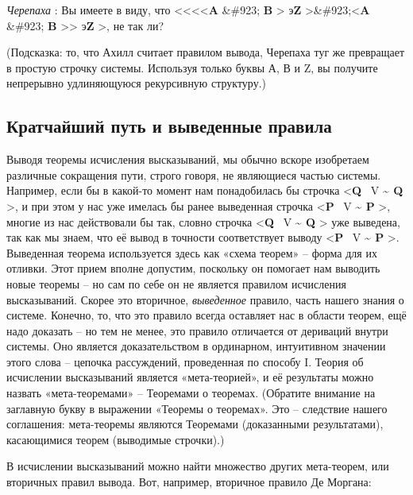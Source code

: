 \documentclass[../main.tex]{subfiles}
\begin{document}
\emph{Черепаха} : Вы имеете в виду, что \textless\textless\textless\textless{}\textbf{A} \&\#923; \textbf{B} \textgreater{} э\textbf{Z} \textgreater\&\#923;\textless{}\textbf{A} \&\#923; \textbf{B} \textgreater\textgreater{} э\textbf{Z} \textgreater, не так ли?

(Подсказка: то, что Ахилл считает правилом вывода, Черепаха туг же превращает в простую строчку системы. Используя только буквы А, В и Z, вы получите непрерывно удлиняющуюся рекурсивную структуру.)


\subsection{Кратчайший путь и выведенные правила}

Выводя теоремы исчисления высказываний, мы обычно вскоре изобретаем различные сокращения пути, строго говоря, не являющиеся частью системы. Например, если бы в какой-то момент нам понадобилась бы строчка \textless{}\textbf{Q} ~V \textbf{\textasciitilde{} Q} \textgreater, и при этом у нас уже имелась бы ранее выведенная строчка \textless{}\textbf{P} ~V \textbf{\textasciitilde{} P} \textgreater, многие из нас действовали бы так, словно строчка \textless{}\textbf{Q} ~V \textbf{\textasciitilde{} Q} \textgreater{} уже выведена, так как мы знаем, что её вывод в точности соответствует выводу \textless{}\textbf{P} ~V \textbf{\textasciitilde{} P} \textgreater. Выведенная теорема используется здесь как «схема теорем» \--- форма для их отливки. Этот прием вполне допустим, поскольку он помогает нам выводить новые теоремы \--- но сам по себе он не является правилом исчисления высказываний. Скорее это вторичное, \emph{выведенное} правило, часть нашего знания о системе. Конечно, то, что это правило всегда оставляет нас в области теорем, ещё надо доказать \--- но тем не менее, это правило отличается от дериваций внутри системы. Оно является доказательством в ординарном, интуитивном значении этого слова \--- цепочка рассуждений, проведенная по способу I. Теория об исчислении высказываний является «мета-теорией», и её результаты можно назвать «мета-теоремами» \--- Теоремами о теоремах. (Обратите внимание на заглавную букву в выражении «Теоремы о теоремах». Это \--- следствие нашего соглашения: мета-теоремы являются Теоремами (доказанными результатами), касающимися теорем (выводимые строчки).)

В исчислении высказываний можно найти множество других мета-теорем, или вторичных правил вывода. Вот, например, вторичное правило Де Моргана:
\end{document}
